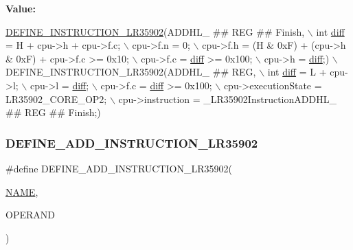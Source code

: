 {\bfseries Value\+:}
\begin{DoxyCode}
\mbox{\hyperlink{isa-lr35902_8c_a3128fc43c5d01e8b51f67901c0b4b5ef}{DEFINE\_INSTRUCTION\_LR35902}}(ADDHL\_ ## REG ## Finish, \(\backslash\)
        \textcolor{keywordtype}{int} \mbox{\hyperlink{isa-lr35902_8c_a65f3a8178e1f997a7a19a988bb0f4e1a}{diff}} = H + cpu->h + cpu->f.c; \(\backslash\)
        cpu->f.n = 0; \(\backslash\)
        cpu->f.h = (H & 0xF) + (cpu->h & 0xF) + cpu->f.c >= 0x10; \(\backslash\)
        cpu->f.c = \mbox{\hyperlink{isa-lr35902_8c_a65f3a8178e1f997a7a19a988bb0f4e1a}{diff}} >= 0x100; \(\backslash\)
        cpu->h = \mbox{\hyperlink{isa-lr35902_8c_a65f3a8178e1f997a7a19a988bb0f4e1a}{diff}};) \(\backslash\)
    DEFINE\_INSTRUCTION\_LR35902(ADDHL\_ ## REG, \(\backslash\)
        \textcolor{keywordtype}{int} \mbox{\hyperlink{isa-lr35902_8c_a65f3a8178e1f997a7a19a988bb0f4e1a}{diff}} = L + cpu->l; \(\backslash\)
        cpu->l = \mbox{\hyperlink{isa-lr35902_8c_a65f3a8178e1f997a7a19a988bb0f4e1a}{diff}}; \(\backslash\)
        cpu->f.c = \mbox{\hyperlink{isa-lr35902_8c_a65f3a8178e1f997a7a19a988bb0f4e1a}{diff}} >= 0x100; \(\backslash\)
        cpu->executionState = LR35902\_CORE\_OP2; \(\backslash\)
        cpu->instruction = \_LR35902InstructionADDHL\_ ## REG ## Finish;)
\end{DoxyCode}
\mbox{\label{isa-lr35902_8c_a314b101f716343769a37639f04357050}} 
\subsubsection{\texorpdfstring{D\+E\+F\+I\+N\+E\+\_\+\+A\+D\+D\+\_\+\+I\+N\+S\+T\+R\+U\+C\+T\+I\+O\+N\+\_\+\+L\+R35902}{DEFINE\_ADD\_INSTRUCTION\_LR35902}}
{\footnotesize\ttfamily \#define D\+E\+F\+I\+N\+E\+\_\+\+A\+D\+D\+\_\+\+I\+N\+S\+T\+R\+U\+C\+T\+I\+O\+N\+\_\+\+L\+R35902(\begin{DoxyParamCaption}\item[{}]{\mbox{\hyperlink{inflate_8h_a164ea0159d5f0b5f12a646f25f99eceaa67bc2ced260a8e43805d2480a785d312}{N\+A\+ME}},  }\item[{}]{O\+P\+E\+R\+A\+ND }\end{DoxyParamCaption})}

